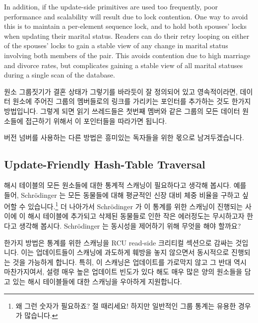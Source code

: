 In addition, if the update-side primitives are used too frequently,
poor performance and scalability will result due to lock contention.
One way to avoid this is to maintain a per-element sequence lock,
and to hold both spouses' locks when updating their marital status.
Readers can do their retry looping on either of the spouses' locks
to gain a stable view of any change in marital status involving both
members of the pair.
This avoids contention due to high marriage and divorce rates, but
complicates gaining a stable view of all marital statuses during a
single scan of the database.
\fi

원소 그룹짓기가 결혼 상태가 그렇기를 바라듯이 잘 정의되어 있고 영속적이라면,
데이터 원소에 주어진 그룹의 멤버들로의 링크를 가리키는 포인터를 추가하는 것도
한가지 방법입니다.
그렇게 되면 읽기 쓰레드들은 첫번째 멤버와 같은 그룹의 모든 데이터 원소들에
접근하기 위해서 이 포인터들을 따라가면 됩니다.

버전 넘버를 사용하는 다른 방법은 흥미있는 독자들을 위한 몫으로 남겨두겠습니다.
\iffalse

If the element groupings are well-defined and persistent, which marital
status is hoped to be,
then one approach is to add pointers to the data elements to link
together the members of a given group.
Readers can then traverse these pointers to access all the data elements
in the same group as the first one located.

Other approaches using version numbering are left as exercises for the
interested reader.
\fi

\subsection{Update-Friendly Hash-Table Traversal}
\label{sec:together:Update-Friendly Hash-Table Traversal}

해시 테이블의 모든 원소들에 대한 통계적 스캐닝이 필요하다고 생각해 봅시다.
예를 들어, Schr\"odinger 는 모든 동물들에 대해 평균적인 신장 대비 체중 비율을
구하고 싶어할 수 있습니다.\footnote{
	왜 그런 숫자가 필요하죠?
	절 때리세요!
	하지만 일반적인 그룹 통계는 유용한 경우가 많습니다.}
더 나아가서 Schr\"odinger 가 이 통계를 위한 스캐닝이 진행되는 사이에 이 해시
테이블에 추가되고 삭제된 동물들로 인한 작은 에러정도는 무시하고자 한다고 생각해
봅시다.
Schr\"odinger 는 동시성을 제어하기 위해 무엇을 해야 할까요?

한가지 방법은 통계를 위한 스캐닝을 RCU read-side 크리티컬 섹션으로 감싸는
것입니다.
이는 업데이트들이 스캐닝에 과도하게 훼방을 놓지 않으면서 동시적으로 진행되는
것을 가능하게 합니다.
특히, 이 스캐닝은 업데이트를 가로막지 않고 그 반대 역시 마찬가지여서, 설령 매우
높은 업데이트 빈도가 있다 해도 매우 많은 양의 원소들을 담고 있는 해시
테이블들에 대한 스캐닝을 우아하게 지원합니다.
\iffalse

